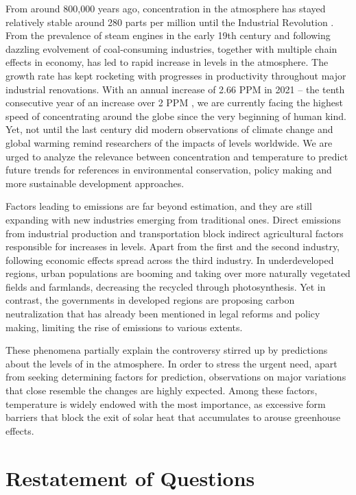 \documentclass[12pt]{article}
\begin{document}
From around 800,000 years ago,  concentration in the atmosphere has stayed relatively stable around 280 parts per million until the Industrial Revolution . From the prevalence of steam engines in the early 19th century and following dazzling evolvement of coal-consuming industries, together with multiple chain effects in economy, has led to rapid increase in  levels in the atmosphere. The growth rate has kept rocketing with progresses in productivity throughout major industrial renovations. With an annual increase of 2.66 PPM in 2021 -- the tenth consecutive year of an increase over 2 PPM , we are currently facing the highest speed of  concentrating around the globe since the very beginning of human kind. Yet, not until the last century did modern observations of climate change and global warming remind researchers of the impacts of  levels worldwide. We are urged to analyze the relevance between  concentration and temperature to predict future trends for references in environmental conservation, policy making and more sustainable development approaches. 

Factors leading to  emissions are far beyond estimation, and they are still expanding with new industries emerging from traditional ones. Direct emissions from industrial production and transportation block indirect agricultural factors responsible for increases in  levels. Apart from the first and the second industry, following economic effects spread across the third industry. In underdeveloped regions, urban populations are booming and taking over more naturally vegetated fields and farmlands, decreasing the  recycled through photosynthesis. Yet in contrast, the governments in developed regions are proposing carbon neutralization that has already been mentioned in legal reforms and policy making, limiting the rise of  emissions to various extents. 

These phenomena partially explain the controversy stirred up by predictions about the levels of  in the atmosphere. In order to stress the urgent need, apart from seeking determining factors for prediction, observations on major variations that close resemble the changes are highly expected. Among these factors, temperature is widely endowed with the most importance, as excessive  form barriers that block the exit of solar heat that accumulates to arouse greenhouse effects.

\section{Restatement of Questions}
\end{document}
